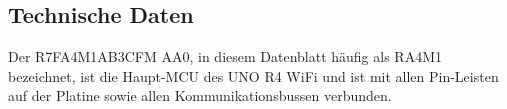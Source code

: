 %
%
%
%
%
%
%
%



\subsection{Technische Daten}

Der R7FA4M1AB3CFM AA0, in diesem Datenblatt häufig als RA4M1 bezeichnet, ist die Haupt-MCU des UNO R4 WiFi und ist mit allen Pin-Leisten auf der Platine sowie allen Kommunikationsbussen verbunden.\cite{Arduino:2026}

